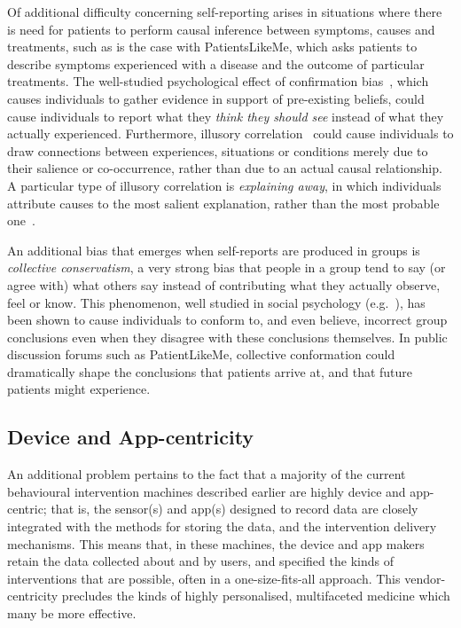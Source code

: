 \documentclass{sig-alternate}
\begin{document}
Of additional difficulty concerning self-reporting arises in situations
where there is need for patients to perform causal inference between
symptoms, causes and treatments, such as is the case with PatientsLikeMe,
which asks patients to describe symptoms experienced with a disease
and the outcome of particular treatments.  The well-studied
psychological effect of confirmation bias~\cite{confirmationbias},
which causes individuals to gather evidence in support of pre-existing
beliefs, could cause individuals to report what they \emph{think they
  should see} instead of what they actually experienced.  Furthermore,
illusory correlation~\cite{chapman1969illusory} could cause
individuals to draw connections between experiences, situations or
conditions merely due to their salience or co-occurrence, rather than
due to an actual causal relationship. A particular type of illusory
correlation is \emph{explaining away}, in which individuals attribute
causes to the most salient explanation, rather than the most probable
one~\cite{gilovich1983biased}.

An additional bias that emerges when self-reports are produced in
groups is \emph{collective conservatism}, a very strong bias that
people in a group tend to say (or agree with) what others say instead
of contributing what they actually observe, feel or know.  This
phenomenon, well studied in social psychology
(e.g.~\cite{aronson2003readings}), has been shown to cause individuals
to conform to, and even believe, incorrect group conclusions even when
they disagree with these conclusions themselves.  In public discussion
forums such as PatientLikeMe, collective conformation could dramatically
shape the conclusions that patients arrive at, and that future patients
might experience.

\subsection{Device and App-centricity}

An additional problem pertains to the fact that a majority of the
current behavioural intervention machines described earlier are highly
device and app-centric; that is, the sensor(s) and app(s) designed to
record data are closely integrated with the methods for storing the
data, and the intervention delivery mechanisms.  This means that, in
these machines, the device and app makers retain the data collected
about and by users, and specified the kinds of interventions that are
possible, often in a one-size-fits-all approach.  This
vendor-centricity precludes the kinds of highly personalised,
multifaceted medicine which many be more effective.
\end{document}
